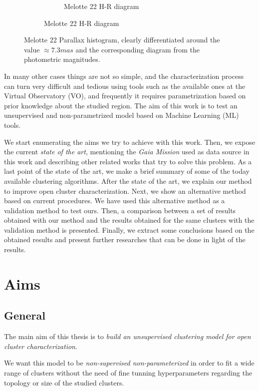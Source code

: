 \documentclass[11pt, a4paper, english]{book}
\begin{document}
\begin{figure}[htbp]
\begin{subfigure}{0.9\textwidth}
\begin{subfigure}[t]{0.45\textwidth}
      \caption{Melotte 22 H-R diagram}
    \end{subfigure}
  \end{subfigure}
  \caption{Melotte 22 Parallax histogram, clearly differentiated around the value $\approx 7.3mas$ and the corresponding diagram from the photometric magnitudes.}
  \label{fig:melotte_22_pm_parallax}
\end{figure}

In many other cases things are not so simple,
and the characterization process can turn very difficult and tedious using tools such as the available ones at the Virtual Observatory (VO),
and frequently it requires parametrization based on prior knowledge about the studied region.
The aim of this work is to test an unsupervised and non-parametrized model based on Machine Learning (ML) tools.

We start enumerating the aims we try to achieve with this work.
Then, we expose the current \emph{state of the art}, mentioning the \emph{Gaia Mission} used as data source in this work and
describing other related works that try to solve this problem.
As a last point of the state of the art, we make a brief summary of some of the today available clustering algorithms.
After the state of the art, we explain our method to improve open cluster characterization.
Next, we show an alternative method based on current procedures. We have used this alternative method as a validation method to test ours.
Then, a comparison between a set of results obtained with our method and the results obtained for the same clusters with the validation method is presented.
Finally, we extract some conclusions based on the obtained results and present further researches that can be done in light of the results.

\chapter{Aims}

\section{General}

The main aim of this thesis is to \emph{build an unsupervised clustering model for open cluster characterization}.

We want this model to be \emph{non-supervised non-parameterized} in order to fit a wide range of clusters without
the need of fine tunning hyperparameters regarding the topology or size of the studied clusters.
\end{document}
